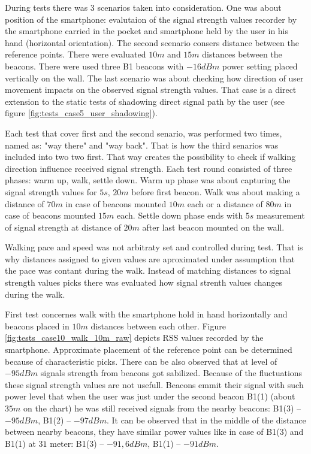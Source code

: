 \documentclass[../main.tex]{subfiles}
\begin{document}
During tests there was 3 scenarios taken into consideration. One was about position of the smartphone: evalutaion of the signal strength values recorder by the smartphone carried in the pocket and smartphone held by the user in his hand (horizontal orientation). The second scenario consers distance between the reference points. There were evaluated $10m$ and $15m$ distances between the beacons. There were used three B1 beacons with $-16dBm$ power setting placed vertically on the wall. The last scenario was about checking how direction of user movement impacts on the observed signal strength values. That case is a direct extension to the static tests of shadowing direct signal path by the user (see figure \ref{fig:tests_case5_user_shadowing}).

Each test that cover first and the second senario, was performed two times, named as: "way there" and "way back". That is how the third senarios was included into two two first. That way creates the possibility to check if walking direction influence received signal strength. Each test round consisted of three phases: warm up, walk, settle down. Warm up phase was about capturing the signal strength values for $5s$, $20m$ before first beacon. Walk was about making a distance of $70m$ in case of beacons mounted $10m$ each or a distance of $80m$ in case of beacons mounted $15m$ each. Settle down phase ends with $5s$ measurement of signal strength at distance of $20m$ after last beacon mounted on the wall.

Walking pace and speed was not arbitraty set and controlled during test. That is why distances assigned to given values are aproximated under assumption that the pace was contant during the walk. Instead of matching distances to signal strength values picks there was evaluated how signal strenth values changes during the walk.


First test concernes walk with the smartphone hold in hand horizontally and beacons placed in $10m$ distances between each other. Figure \ref{fig:tests_case10_walk_10m_raw} depicts RSS values recorded by the smartphone. Approximate placement of the reference point can be determined because of characteristic picks. There can be also observed that at level of $-95dBm$ signals strength from beacons got sabilized. Because of the fluctuations these signal strength values are not usefull. Beacons emmit their signal with such power level that when the user was just under the second beacon B1(1) (about $35m$ on the chart) he was still received signals from the nearby beacons: B1(3) -- $-95dBm$, B1(2) -- $-97dBm$. It can be observed that in the middle of the distance between nearby beacons, they have similar power values like in case of B1(3) and B1(1) at $31$ meter: B1(3) -- $-91,6dBm$, B1(1) -- $-91dBm$.
\end{document}
